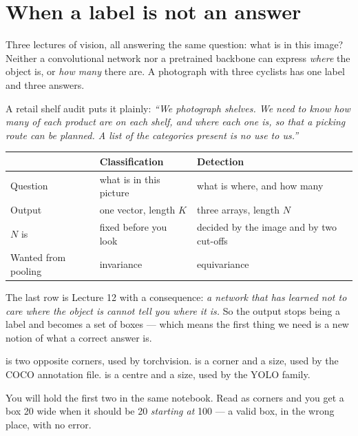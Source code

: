 \documentclass[11pt,a4paper]{article}
\begin{document}

\section{When a label is not an answer}

Three lectures of vision, all answering the same question: what is in this
image? Neither a convolutional network nor a pretrained backbone can express
\emph{where} the object is, or \emph{how many} there are. A photograph with
three cyclists has one label and three answers.

A retail shelf audit puts it plainly: \emph{``We photograph shelves. We need to
know how many of each product are on each shelf, and where each one is, so that
a picking route can be planned. A list of the categories present is no use to
us.''}

\begin{center}
\small
\begin{tabular}{lll}
\toprule
& \textbf{Classification} & \textbf{Detection} \\
\midrule
Question & what is in this picture & what is where, and how many \\
Output & one vector, length $K$ & three arrays, length $N$ \\
$N$ is & fixed before you look & decided by the image and by two cut-offs \\
Wanted from pooling & invariance & equivariance \\
\bottomrule
\end{tabular}
\end{center}

The last row is Lecture 12 with a consequence: \emph{a network that has learned
not to care where the object is cannot tell you where it is.} So the output
stops being a label and becomes a set of boxes --- which means the first thing
we need is a new notion of what a correct answer is.

\begin{failbox}[title={Failure condition --- a box is four numbers, and which four is not agreed}]
\code{[x1, y1, x2, y2]} is two opposite corners, used by torchvision.
\code{[x, y, w, h]} is a corner and a size, used by the COCO annotation file.
\code{[cx, cy, w, h]} is a centre and a size, used by the YOLO family.

You will hold the first two in the same notebook. Read \code{[100, 50, 20, 30]}
as corners and you get a box 20 wide when it should be 20 \emph{starting at}
100 --- a valid box, in the wrong place, with no error.
\end{failbox}
\end{document}
